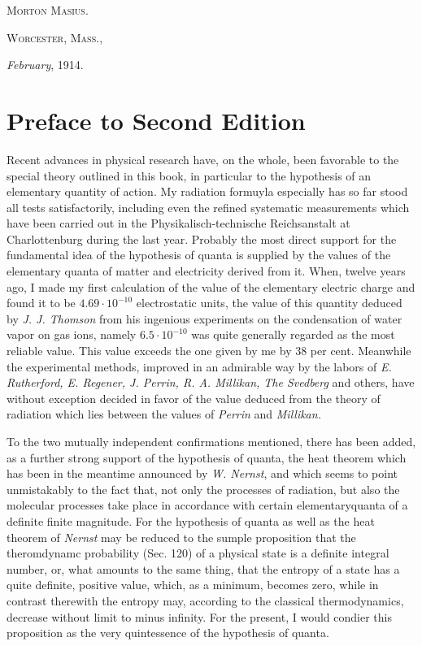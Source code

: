 \documentclass[12pt,oneside]{book}
\begin{document}
\begin{flushright}
    \textsc{Morton Masius.}
\end{flushright} \par 
\textsc{Worcester, Mass.,} \par
\textit{February}, 1914.

\chapter{Preface to Second Edition}
Recent advances in physical research have, on the whole, been favorable to the special theory outlined in this book, in particular to the hypothesis of an elementary quantity of action. My radiation formuyla especially has so far stood all tests satisfactorily, including even the refined systematic measurements which have been carried out in the Physikalisch-technische Reichsanstalt at Charlottenburg during the last year. Probably the most direct support for the fundamental idea of the hypothesis of quanta is supplied by the values of the elementary quanta of matter and electricity derived from it. When, twelve years ago, I made my first calculation of the value of the elementary electric charge and found it to be $4.69\cdot 10^{-10}$ electrostatic units, the value of this quantity deduced by \textit{J. J. Thomson} from his ingenious experiments on the condensation of water vapor on gas ions, namely $6.5\cdot 10^{-10}$ was quite generally regarded as the most reliable value. This value exceeds the one given by me by 38 per cent. Meanwhile the experimental methods, improved in an admirable way by the labors of \textit{E. Rutherford, E. Regener, J. Perrin, R. A. Millikan, The Svedberg} and others, have without exception decided in favor of the value deduced from the theory of radiation which lies between the values of \textit{Perrin} and \textit{Millikan.} \par 

To the two mutually independent confirmations mentioned, there has been added, as a further strong support of the hypothesis of quanta, the heat theorem which has been in the meantime announced by \textit{W. Nernst}, and which seems to point unmistakably to the fact that, not only the processes of radiation, but also the molecular processes take place in accordance with certain elementaryquanta of a definite finite magnitude. For the hypothesis of quanta as well as the heat theorem of \textit{Nernst} may be reduced to the sumple proposition that the theromdynamc probability (Sec. 120) of a physical state is a definite integral number, or, what amounts to the same thing, that the entropy of a state has a quite definite, positive value, which, as a minimum, becomes zero, while in contrast therewith the entropy may, according to the classical thermodynamics, decrease without limit to minus infinity. For the present, I would condier this proposition as the very quintessence of the hypothesis of quanta. \par 
\end{document}
